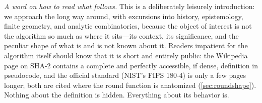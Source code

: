 \noindent\textit{A word on how to read what follows.} This is a
deliberately leisurely introduction: we approach \SHA{} the long way
around, with excursions into history, epistemology, finite geometry, and
analytic combinatorics, because the object of interest is not the
algorithm so much as where it sits---its context, its significance, and
the peculiar shape of what is and is not known about it. Readers
impatient for the algorithm itself should know that it is short and
entirely public: the Wikipedia page on SHA-2 contains a complete and
perfectly accessible, if dense, definition in pseudocode, and the
official standard (NIST's FIPS 180-4) is only a few pages longer; both
are cited where the round function is anatomized (\cref{sec:roundshape}).
Nothing about the definition is hidden. Everything about its behavior is.
\bigskip
